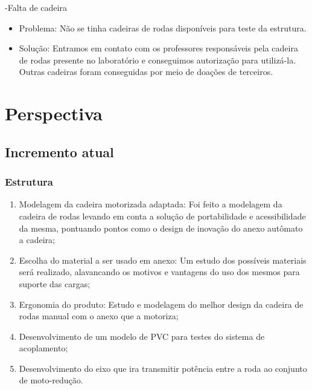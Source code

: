 -Falta de cadeira
 \begin{itemize}
  \item Problema: Não se tinha cadeiras de rodas disponíveis para teste da estrutura.
  \item Solução: Entramos em contato com os professores responsáveis pela cadeira de rodas presente no laboratório e conseguimos autorização para utilizá-la. Outras cadeiras foram conseguidas por meio de doações de terceiros.

 \end{itemize}

\chapter[Perspectiva]{Perspectiva}

\section{Incremento atual}
  \subsection{Estrutura}
    \begin{enumerate}
      \item Modelagem da cadeira motorizada adaptada: Foi feito a modelagem da cadeira de rodas levando em conta a solução de portabilidade e acessibilidade da mesma, pontuando pontos como o design de inovação do anexo autômato a cadeira;

      \item Escolha do material a ser usado em anexo: Um estudo dos possíveis materiais será realizado, alavancando os motivos e vantagens do uso dos mesmos para suporte das cargas;

      \item Ergonomia do produto: Estudo e modelagem do melhor design da cadeira de rodas manual com o anexo que a motoriza;

 \item Desenvolvimento de um modelo de PVC para testes do sistema de acoplamento;

 \item Desenvolvimento do eixo que ira transmitir potência entre a roda ao conjunto de moto-redução.

    \end{enumerate}
